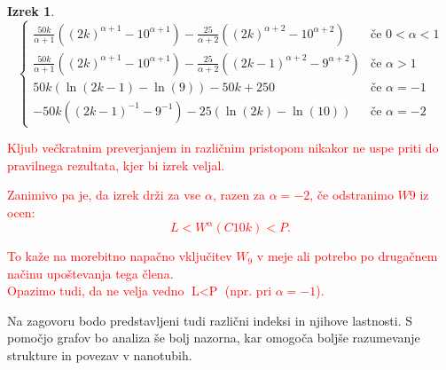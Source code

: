 \documentclass[a4paper, 12pt]{article}
\newtheorem{izrek}{Izrek}[section]
\begin{document}
\begin{izrek}
\begin{equation*}
\begin{cases}
            \frac{50k}{\alpha + 1} \left( (2k)^{\alpha + 1} - 10^{\alpha + 1} \right) - 
            \frac{25}{\alpha + 2} \left( (2k)^{\alpha + 2} - 10^{\alpha + 2} \right) & \text{če } 0 < \alpha < 1 \\
    
            \frac{50k}{\alpha + 1} \left( (2k)^{\alpha + 1} - 10^{\alpha + 1} \right) - 
            \frac{25}{\alpha + 2} \left( (2k-1)^{\alpha + 2} - 9^{\alpha + 2} \right) & \text{če } \alpha > 1 \\
    
            50k \left( \ln(2k-1) - \ln(9) \right) - 50k + 250 & \text{če } \alpha = -1 \\
    
            -50k \left( (2k-1)^{-1} - 9^{-1} \right) - 25 \left( \ln(2k) - \ln(10) \right) & \text{če } \alpha = -2
        \end{cases}
    \end{equation*}
    


    
\end{izrek}


\textcolor{red}{
   Kljub večkratnim preverjanjem in različnim pristopom nikakor ne uspe priti do pravilnega rezultata, 
   kjer bi izrek veljal. 
   
   Zanimivo pa je, da izrek drži za vse $\alpha$, razen za $\alpha = -2$, če odstranimo $W9$ iz ocen:
   \[
   L < W^\alpha(C{10k}) < P.
   \]
   
   To kaže na morebitno napačno vključitev $W_9$ v meje ali potrebo po drugačnem načinu upoštevanja tega člena. \\
    Opazimo tudi, da ne velja vedno $ \text{L} < \text{P} $ (npr. pri $\alpha = -1$).
}

Na zagovoru bodo predstavljeni tudi različni indeksi in njihove lastnosti.
S pomočjo grafov bo analiza še bolj nazorna, kar omogoča boljše razumevanje strukture in povezav v nanotubih.
\end{document}
